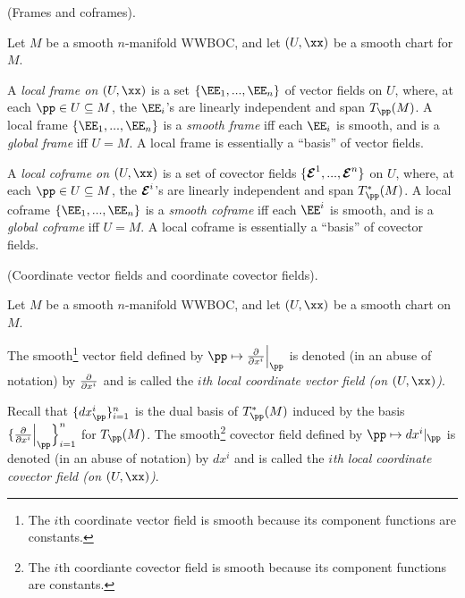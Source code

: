 \begin{defn}
     (Frames and coframes).
    
    Let $M$ be a smooth $n$-manifold WWBOC, and let $(U, \xx)$ be a smooth chart for $M$.
    
    A \textit{local frame on $(U, \xx)$} is a set $\{\EE_1, ..., \EE_n\}$ of vector fields on $U$, where, at each $\pp \in U \subseteq M$, the $\EE_i$'s are linearly independent and span $T_\pp(M)$. A local frame $\{\EE_1, ..., \EE_n\}$ is a \textit{smooth frame} iff each $\EE_i$ is smooth, and is a \textit{global frame} iff $U = M$. A local frame is essentially a ``basis'' of vector fields.
    
    A \textit{local coframe on $(U, \xx)$} is a set of covector fields $\{\boldsymbol{\mathcal{E}}^1, ..., \boldsymbol{\mathcal{E}}^n\}$ on $U$, where, at each $\pp \in U \subseteq M$, the $\boldsymbol{\mathcal{E}}^i$'s are linearly independent and span $T_\pp^*(M)$. A local coframe $\{\EE_1, ..., \EE_n\}$ is a \textit{smooth coframe} iff each $\EE^i$ is smooth, and is a \textit{global coframe} iff $U = M$. A local coframe is essentially a ``basis'' of covector fields.
\end{defn}

\begin{defn}
     (Coordinate vector fields and coordinate covector fields).
    
    Let $M$ be a smooth $n$-manifold WWBOC, and let  $(U, \xx)$ be a smooth chart on $M$.
    
    The smooth\footnote{The $i$th coordinate vector field is smooth because its component functions are constants.} vector field defined by $\pp \mapsto \frac{\pd}{\pd x^i}\Big|_\pp$ is denoted (in an abuse of notation) by $\frac{\partial}{\partial x^i}$ and is called the \textit{$i$th local coordinate vector field (on $(U, \xx)$)}. 
    
    Recall that $\{ dx^i_\pp \}_{i = 1}^n$ is the dual basis of $T_\pp^*(M)$ induced by the basis $\{ \frac{\pd}{\pd x^i}\Big|_\pp \Big\}_{i = 1}^n$ for $T_\pp(M)$. The smooth\footnote{The $i$th coordiante covector field is smooth because its component functions are constants.} covector field defined by $\pp \mapsto dx^i|_\pp$ is denoted (in an abuse of notation) by $dx^i$ and is called the \textit{$i$th local coordinate covector field (on $(U, \xx)$)}.
\end{defn}

